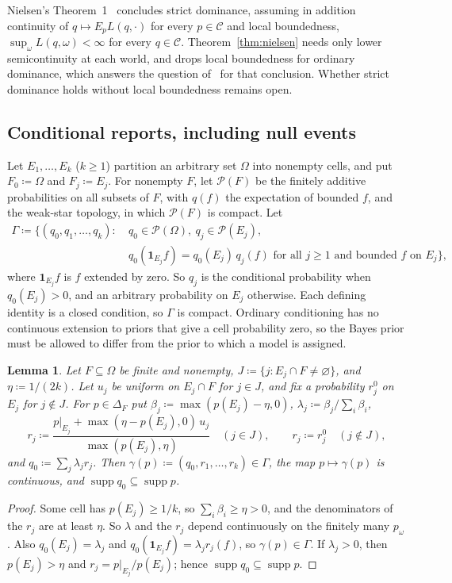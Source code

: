 \documentclass[11pt]{article}
\newtheorem{lemma}[theorem]{Lemma}
\theoremstyle{definition}
\theoremstyle{remark}
\newcommand{\C}{\mathcal C}
\newcommand{\PP}{\mathcal P}
\newcommand{\one}{\mathbf 1}
\newcommand{\supp}{\operatorname{supp}}
\begin{document}
Nielsen's Theorem~1~\cite{Nielsen} concludes strict dominance, assuming in addition continuity of $q\mapsto E_pL(q,\cdot)$ for every $p\in\C$ and local boundedness, $\sup_\omega L(q,\omega)<\infty$ for every $q\in\C$. Theorem~\ref{thm:nielsen} needs only lower semicontinuity at each world, and drops local boundedness for ordinary dominance, which answers the question of~\cite[\S4.2.1]{Nielsen} for that conclusion. Whether strict dominance holds without local boundedness remains open.

\subsection{Conditional reports, including null events}\label{sec:conditional}
Let $E_1,\dots,E_k$ ($k\ge1$) partition an arbitrary set $\Omega$ into nonempty cells, and put $F_0\coloneqq\Omega$ and $F_j\coloneqq E_j$. For nonempty $F$, let $\PP(F)$ be the finitely additive probabilities on all subsets of $F$, with $q(f)$ the expectation of bounded $f$, and the weak-star topology, in which $\PP(F)$ is compact. Let
\[
\begin{aligned}
\Gamma\coloneqq\bigl\{(q_0,q_1,\dots,q_k):\ & q_0\in\PP(\Omega),\ q_j\in\PP(E_j),\\
& q_0(\one_{E_j}f)=q_0(E_j)\,q_j(f)\text{ for all }j\ge1\text{ and bounded }f\text{ on }E_j\bigr\},
\end{aligned}
\]
where $\one_{E_j}f$ is $f$ extended by zero. So $q_j$ is the conditional probability when $q_0(E_j)>0$, and an arbitrary probability on $E_j$ otherwise. Each defining identity is a closed condition, so $\Gamma$ is compact. Ordinary conditioning has no continuous extension to priors that give a cell probability zero, so the Bayes prior must be allowed to differ from the prior to which a model is assigned.

\begin{lemma}\label{lem:section}
Let $F\subseteq\Omega$ be finite and nonempty, $J\coloneqq\{j:E_j\cap F\ne\varnothing\}$, and $\eta\coloneqq1/(2k)$. Let $u_j$ be uniform on $E_j\cap F$ for $j\in J$, and fix a probability $r_j^0$ on $E_j$ for $j\notin J$. For $p\in\Delta_F$ put $\beta_j\coloneqq\max(p(E_j)-\eta,0)$, $\lambda_j\coloneqq\beta_j/\sum_i\beta_i$,
\[
r_j\coloneqq\frac{p|_{E_j}+\max(\eta-p(E_j),0)\,u_j}{\max(p(E_j),\eta)}\quad(j\in J),\qquad r_j\coloneqq r_j^0\quad(j\notin J),
\]
and $q_0\coloneqq\sum_j\lambda_jr_j$. Then $\gamma(p)\coloneqq(q_0,r_1,\dots,r_k)\in\Gamma$, the map $p\mapsto\gamma(p)$ is continuous, and $\supp q_0\subseteq\supp p$.
\end{lemma}
\begin{proof}
Some cell has $p(E_j)\ge1/k$, so $\sum_i\beta_i\ge\eta>0$, and the denominators of the $r_j$ are at least $\eta$. So $\lambda$ and the $r_j$ depend continuously on the finitely many $p_\omega$. Also $q_0(E_j)=\lambda_j$ and $q_0(\one_{E_j}f)=\lambda_jr_j(f)$, so $\gamma(p)\in\Gamma$. If $\lambda_j>0$, then $p(E_j)>\eta$ and $r_j=p|_{E_j}/p(E_j)$; hence $\supp q_0\subseteq\supp p$.
\end{proof}
\end{document}
